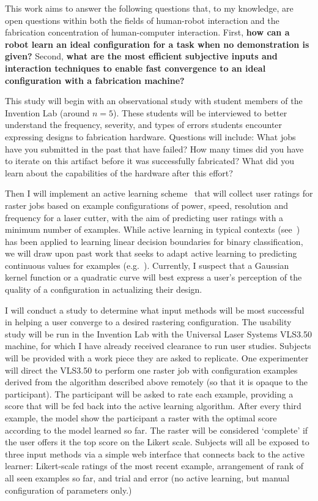 \documentclass[12pt]{memoir}
\begin{document}
This work aims to answer the following questions that, to my knowledge, are open questions within both the fields of human-robot interaction and the fabrication concentration of human-computer interaction.
First, \textbf{how can a robot learn an ideal configuration for a task when no demonstration is given?}
Second, \textbf{what are the most efficient subjective inputs and interaction techniques to enable fast convergence to an ideal configuration with a fabrication machine?}

This study will begin with an observational study with student members of the Invention Lab (around $n=5$).
These students will be interviewed to better understand the frequency, severity, and types of errors students encounter expressing designs to fabrication hardware.
Questions will include:
What jobs have you submitted in the past that have failed?
How many times did you have to iterate on this artifact before it was successfully fabricated?
What did you learn about the capabilities of the hardware after this effort?

Then I will implement an active learning scheme~\cite{settles_active_2010} that will collect user ratings for raster jobs based on example configurations of power, speed, resolution and frequency for a laser cutter, with the aim of predicting user ratings with a minimum number of examples.
While active learning in typical contexts (see~\cite{settles_active_2010}) has been applied to learning linear decision boundaries for binary classification, we will draw upon past work that seeks to adapt active learning to predicting continuous values for examples (e.g.~\cite{sugiyama_active_2008}).
Currently, I suspect that a Gaussian kernel function or a quadratic curve will best express a user's perception of the quality of a configuration in actualizing their design.

I will conduct a study to determine what input methods will be most successful in helping a user converge to a desired rastering configuration.
The usability study will be run in the Invention Lab with the Universal Laser Systems VLS3.50 machine, for which I have already received clearance to run user studies.
Subjects will be provided with a work piece they are asked to replicate.
One experimenter will direct the VLS3.50 to perform one raster job with configuration examples derived from the algorithm described above remotely (so that it is opaque to the participant).
The participant will be asked to rate each example, providing a score that will be fed back into the active learning algorithm.
After every third example, the model show the participant a raster with the optimal score according to the model learned so far.
The raster will be considered `complete' if the user offers it the top score on the Likert scale.
Subjects will all be exposed to three input methods via a simple web interface that connects back to the active learner:
Likert-scale ratings of the most recent example, arrangement of rank of all seen examples so far, and trial and error (no active learning, but manual configuration of parameters only.)
\end{document}
